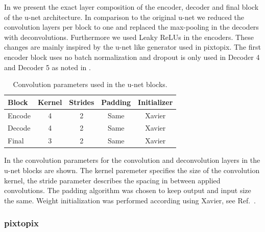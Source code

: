In  we present the exact layer composition of the
encoder, decoder and final block of the u-net architecture. In comparison to
the original u-net we reduced the convolution layers per block to one and
replaced the max-pooling in the decoders with deconvolutions. Furthermore
we used Leaky ReLUs in the encoders. These changes are mainly inspired by the
u-net like generator used in pixtopix. The first encoder block uses no batch
normalization and dropout is only used in Decoder \num{4} and Decoder \num{5}
as noted in .
\begin{table}[h]
  \centering
  \begin{tabular}{lcccc}
    \toprule
    Block & Kernel & Strides & Padding & Initializer \\
    \midrule
    Encode & \num{4} & \num{2} & Same & Xavier \\
    Decode & \num{4} & \num{2} & Same & Xavier \\
    Final  & \num{3} & \num{2} & Same & Xavier \\
    \bottomrule
  \end{tabular}
  \caption{Convolution parameters used in the u-net blocks.
  }\label{tab:unet:conv}
\end{table}
In  the convolution parameters for the convolution and
deconvolution layers in the u-net blocks are shown. The kernel paremeter
specifies the size of the convolution kernel, the stride parameter describes
the spacing in between applied convolutions. The padding algorithm was chosen
to keep output and input size the same. Weight initialization was performed
according using Xavier, see Ref.~\cite{Xavier2010}.

\subsubsection{pixtopix}

